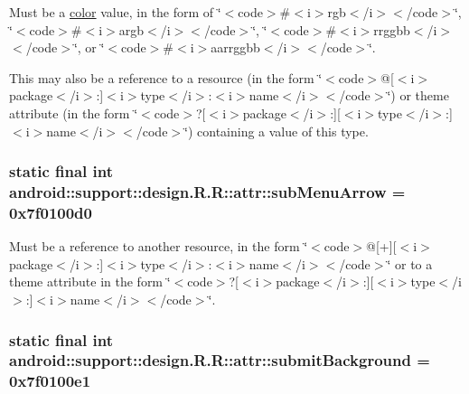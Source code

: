 Must be a \hyperlink{classandroid_1_1support_1_1design_1_1_r_1_1color}{color} value, in the form of \char`\"{}$<$code$>$\#$<$i$>$rgb$<$/i$>$$<$/code$>$\char`\"{}, \char`\"{}$<$code$>$\#$<$i$>$argb$<$/i$>$$<$/code$>$\char`\"{}, \char`\"{}$<$code$>$\#$<$i$>$rrggbb$<$/i$>$$<$/code$>$\char`\"{}, or \char`\"{}$<$code$>$\#$<$i$>$aarrggbb$<$/i$>$$<$/code$>$\char`\"{}. 

This may also be a reference to a resource (in the form \char`\"{}$<$code$>$@\mbox{[}$<$i$>$package$<$/i$>$:\mbox{]}$<$i$>$type$<$/i$>$:$<$i$>$name$<$/i$>$$<$/code$>$\char`\"{}) or theme attribute (in the form \char`\"{}$<$code$>$?\mbox{[}$<$i$>$package$<$/i$>$:\mbox{]}\mbox{[}$<$i$>$type$<$/i$>$:\mbox{]}$<$i$>$name$<$/i$>$$<$/code$>$\char`\"{}) containing a value of this type. \hypertarget{classandroid_1_1support_1_1design_1_1_r_1_1attr_4bf79d1007fca69da46a50dbbd289806}{
\subsubsection[{subMenuArrow}]{\setlength{\rightskip}{0pt plus 5cm}static final int android::support::design.R.R::attr::subMenuArrow = 0x7f0100d0}}
\label{classandroid_1_1support_1_1design_1_1_r_1_1attr_4bf79d1007fca69da46a50dbbd289806}


Must be a reference to another resource, in the form \char`\"{}$<$code$>$@\mbox{[}+\mbox{]}\mbox{[}$<$i$>$package$<$/i$>$:\mbox{]}$<$i$>$type$<$/i$>$:$<$i$>$name$<$/i$>$$<$/code$>$\char`\"{} or to a theme attribute in the form \char`\"{}$<$code$>$?\mbox{[}$<$i$>$package$<$/i$>$:\mbox{]}\mbox{[}$<$i$>$type$<$/i$>$:\mbox{]}$<$i$>$name$<$/i$>$$<$/code$>$\char`\"{}. \hypertarget{classandroid_1_1support_1_1design_1_1_r_1_1attr_a411aa6318e8c3c9246690c71f3a992a}{
\subsubsection[{submitBackground}]{\setlength{\rightskip}{0pt plus 5cm}static final int android::support::design.R.R::attr::submitBackground = 0x7f0100e1}}
\label{classandroid_1_1support_1_1design_1_1_r_1_1attr_a411aa6318e8c3c9246690c71f3a992a}


